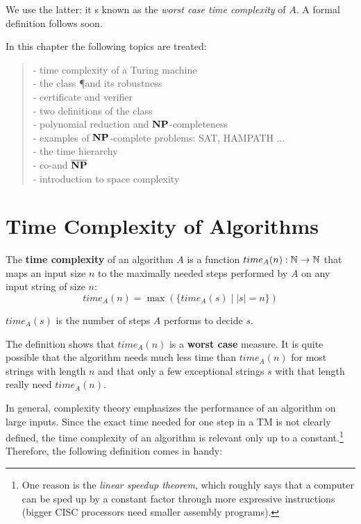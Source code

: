 We use the latter: it s known as the {\em worst case time complexity}
of $A$. A formal definition follows soon.

In this chapter the following topics are treated:

\begin{verse}
- time complexity of a Turing machine
\\
- the class \P and its robustness
\\
- certificate and verifier
\\
- two definitions of the class \NP
\\
- polynomial reduction and ${\bf NP}$-completeness
\\
- examples of ${\bf NP}$-complete problems: SAT, HAMPATH ...
\\
- the time hierarchy
\\
- co-\NP and $\overline{{\bf NP}}$
\\
- introduction to space complexity
\end{verse}


\section{Time Complexity of Algorithms}

\begin{definition}
The {\bf time complexity} of an algorithm $A$ is a function
  $time_A(n):\mathbb{N}\rightarrow \mathbb{N}$ that maps an input size $n$ to the
  maximally needed steps performed by $A$ on any input string of size $n$:
\begin{equation*}
	time_A(n) = \max(\{time_A(s)\mid |s| = n\})
\end{equation*}

$time_A(s)$ is the number of steps $A$ performs to decide $s$.
\end{definition}

The definition shows that $time_A(n)$ is a {\bf worst case}
measure. It is quite possible that the algorithm needs much less time
than $time_A(n)$ for most strings with length $n$ and that only a few
exceptional strings $s$ with that length really need $time_A(n)$.

In general, complexity theory emphasizes the performance of an
algorithm on large inputs. Since the exact time needed for one step in
a TM is not clearly defined, the time complexity of an algorithm is
relevant only up to a constant.\footnote{One reason is the \emph{linear speedup theorem}, which roughly says that a computer can be sped up by a constant factor through more expressive instructions (bigger CISC processors need smaller assembly programs).} Therefore, the following definition comes in handy:

